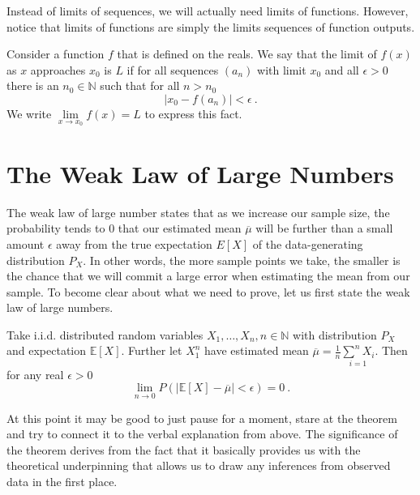 Instead of limits of sequences, we will actually need limits of functions. However, notice that limits of functions are simply the limits sequences of function
outputs. 

\begin{Definition}
Consider a function $ f $ that is defined on the reals. We say that the limit of $ f(x) $ as $ x $ approaches $ x_{0} $ is $ L $ if for all sequences 
$ \left( a_{n} \right) $ with limit $ x_{0} $ and all $ \epsilon > 0 $ there is an $ n_{0} \in \mathbb{N} $ such that for all $ n > n_{0} $ 
$$  | x_{0} - f\left(a_{n}\right) | < \epsilon \ .$$
We write $ \underset{x \rightarrow x_{0}}{\lim} f(x) = L $ to express this fact. \\
\end{Definition}

\section{The Weak Law of Large Numbers}\label{LawOfLargeNumbers}
The weak law of large number states that as we increase our sample size, the probability tends to 0 that our estimated mean $ \overline{\mu} $ will be further than a small
amount $ \epsilon $ away from the true expectation $ E[X] $ of the data-generating distribution $ P_{X} $. In other words, the more sample points we take, 
the smaller is the chance that we will commit a large error when estimating the mean from our sample. To become clear about what we need to prove, let us first state
the weak law of large numbers.

\begin{Theorem}\label{weakLaw}
Take i.i.d. distributed random variables $ X_{1}, \ldots, X_{n}, n \in \mathbb{N} $ with distribution $ P_{X} $ and expectation $ \mathbb{E}[X] $. Further let
$ X_{1}^{n} $ have estimated mean $ \overline{\mu} = \frac{1}{n} \underset{i=1}{\overset{n}{\sum}X_{i}} $. Then for any real $ \epsilon > 0 $
$$ \underset{n \rightarrow 0}{\lim}P(|\mathbb{E}[X] - \overline{\mu}| < \epsilon) = 0 \ . $$
\end{Theorem}

At this point it may be good to just pause for a moment, stare at the theorem and try to connect it to the verbal explanation from above. The significance of the theorem
derives from the fact that it basically provides us with the theoretical underpinning that allows us to draw any inferences from observed data in the first place.

